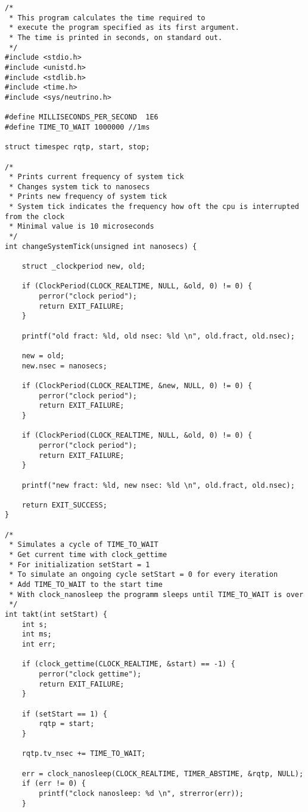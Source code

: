 \documentclass[12pt,a4paper,bibliography=totocnumbered]{scrartcl}
\begin{document}
\begin{lstlisting}[style=CStyle]
/*
 * This program calculates the time required to
 * execute the program specified as its first argument.
 * The time is printed in seconds, on standard out.
 */
#include <stdio.h>
#include <unistd.h>
#include <stdlib.h>
#include <time.h>
#include <sys/neutrino.h>

#define MILLISECONDS_PER_SECOND  1E6
#define TIME_TO_WAIT 1000000 //1ms

struct timespec rqtp, start, stop;

/*
 * Prints current frequency of system tick
 * Changes system tick to nanosecs
 * Prints new frequency of system tick
 * System tick indicates the frequency how oft the cpu is interrupted from the clock
 * Minimal value is 10 microseconds
 */
int changeSystemTick(unsigned int nanosecs) {

	struct _clockperiod new, old;

	if (ClockPeriod(CLOCK_REALTIME, NULL, &old, 0) != 0) {
		perror("clock period");
		return EXIT_FAILURE;
	}

	printf("old fract: %ld, old nsec: %ld \n", old.fract, old.nsec);

	new = old;
	new.nsec = nanosecs;

	if (ClockPeriod(CLOCK_REALTIME, &new, NULL, 0) != 0) {
		perror("clock period");
		return EXIT_FAILURE;
	}

	if (ClockPeriod(CLOCK_REALTIME, NULL, &old, 0) != 0) {
		perror("clock period");
		return EXIT_FAILURE;
	}

	printf("new fract: %ld, new nsec: %ld \n", old.fract, old.nsec);

	return EXIT_SUCCESS;
}

/* 
 * Simulates a cycle of TIME_TO_WAIT
 * Get current time with clock_gettime
 * For initialization setStart = 1
 * To simulate an ongoing cycle setStart = 0 for every iteration
 * Add TIME_TO_WAIT to the start time
 * With clock_nanosleep the programm sleeps until TIME_TO_WAIT is over
 */
int takt(int setStart) {
	int s;
	int ms;
	int err;

	if (clock_gettime(CLOCK_REALTIME, &start) == -1) {
		perror("clock gettime");
		return EXIT_FAILURE;
	}

	if (setStart == 1) {
		rqtp = start;
	}

	rqtp.tv_nsec += TIME_TO_WAIT;

	err = clock_nanosleep(CLOCK_REALTIME, TIMER_ABSTIME, &rqtp, NULL);
	if (err != 0) {
		printf("clock nanosleep: %d \n", strerror(err));
	}


\end{lstlisting}
\end{document}
